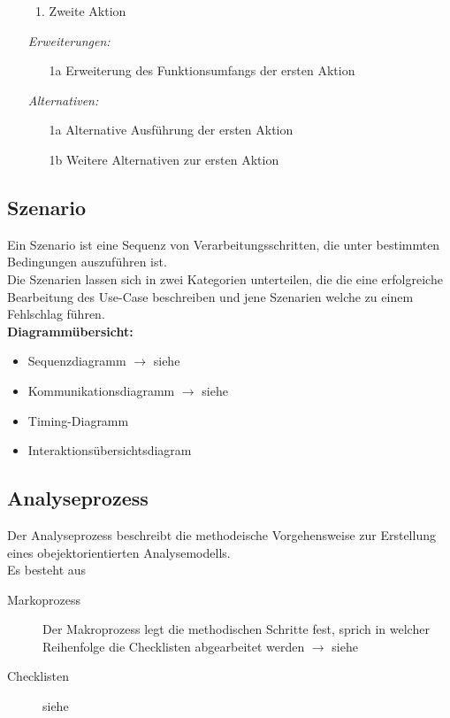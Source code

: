 \begin{description}[leftmargin=2cm]
\begin{itemize}[leftmargin=4cm]
\begin{enumerate}[leftmargin=0.5cm]
            \item Zweite Aktion
          \end{enumerate}
        \item[\textit{Erweiterungen:}]
          \begin{enumerate}[leftmargin=0.5cm]
            \item[1a] Erweiterung des Funktionsumfangs der ersten Aktion
          \end{enumerate}
        \item[\textit{Alternativen:}]
          \begin{enumerate}[leftmargin=0.5cm]
            \item[1a] Alternative Ausführung der ersten Aktion
            \item[1b] Weitere Alternativen zur ersten Aktion
          \end{enumerate}
        \item[\Balzert{68}]
      \end{itemize}
	\end{description}


\subsection{Szenario }
  Ein Szenario ist eine Sequenz von Verarbeitungsschritten, die unter bestimmten
  Bedingungen auszuführen ist.\\
  Die Szenarien lassen sich in zwei Kategorien unterteilen, die die eine erfolgreiche Bearbeitung
  des Use-Case beschreiben und jene Szenarien welche zu einem Fehlschlag führen. \\
  
  \textbf{Diagrammübersicht:}
  \begin{itemize}[leftmargin=0.5cm]
    \item Sequenzdiagramm $\rightarrow$ siehe 
    \item Kommunikationsdiagramm $\rightarrow$ siehe 
    \item Timing-Diagramm
    \item Interaktionsübersichtsdiagram
  \end{itemize}
  
\subsection{Analyseprozess }
  Der Analyseprozess beschreibt die methodeische Vorgehensweise zur Erstellung eines
  obejektorientierten Analysemodells.\\
  
  Es besteht aus
  \begin{description}
    \item[Markoprozess]
      Der Makroprozess legt die methodischen Schritte fest, sprich in welcher
      Reihenfolge die Checklisten abgearbeitet werden $\rightarrow$ siehe 
    \item[Checklisten]
      siehe 
  \end{description}
  
  